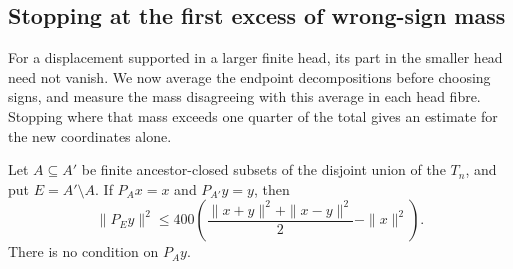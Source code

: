\subsection{Stopping at the first excess of wrong-sign mass}
\label{sec:linear-stopped-fibers}

For a displacement supported in a larger finite head, its part in the
smaller head need not vanish. We now average the endpoint decompositions before choosing signs, and
measure the mass disagreeing with this average in each head fibre.
Stopping where that mass exceeds one quarter of the total gives an
estimate for the new coordinates alone.

\begin{theorem}
\label{thm:linear-fresh-layer-400}
Let \(A\subseteq A'\) be finite ancestor-closed subsets of the disjoint
union of the \(T_n\), and put \(E=A'\setminus A\). If
\(P_Ax=x\) and \(P_{A'}y=y\), then
\begin{equation}\label{eq:linear-fresh-layer-400}
 \|P_Ey\|^2\le400\left(
       \frac{\|x+y\|^2+\|x-y\|^2}{2}-\|x\|^2\right).
\end{equation}
There is no condition on \(P_Ay\).
\end{theorem}
